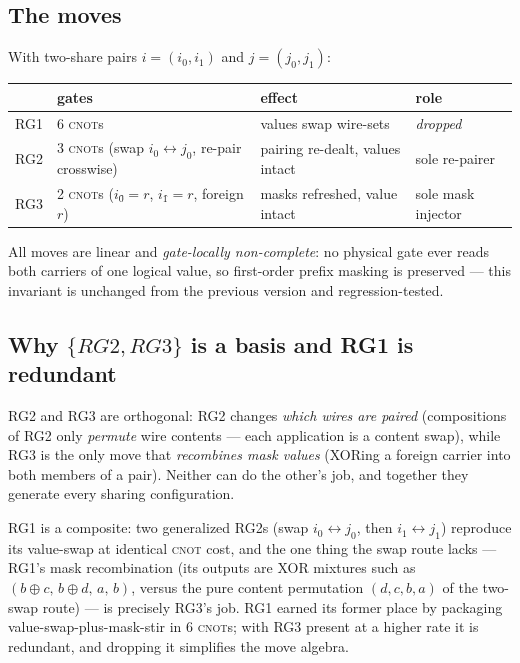 \documentclass[11pt]{article}
\newcommand{\CNOT}{\textsc{cnot}}
\begin{document}
\subsection{The moves}

With two-share pairs $i=(i_0,i_1)$ and $j=(j_0,j_1)$:

\begin{center}
\begin{tabular}{llll}
\toprule
 & gates & effect & role \\
\midrule
RG1 & 6 \CNOT{}s & values swap wire-sets & \emph{dropped} \\
RG2 & 3 \CNOT{}s (swap $i_0 \leftrightarrow j_0$, re-pair crosswise) & pairing re-dealt, values intact & sole re-pairer \\
RG3 & 2 \CNOT{}s ($i_0 \mathrel{\hat{}}= r$, $i_1 \mathrel{\hat{}}= r$, foreign $r$) & masks refreshed, value intact & sole mask injector \\
\bottomrule
\end{tabular}
\end{center}

All moves are linear and \emph{gate-locally non-complete}: no physical gate
ever reads both carriers of one logical value, so first-order prefix
masking is preserved --- this invariant is unchanged from the previous
version and regression-tested.

\subsection{Why $\{RG2, RG3\}$ is a basis and RG1 is redundant}

RG2 and RG3 are orthogonal: RG2 changes \emph{which wires are paired}
(compositions of RG2 only \emph{permute} wire contents --- each application
is a content swap), while RG3 is the only move that \emph{recombines mask
values} (XORing a foreign carrier into both members of a pair). Neither can
do the other's job, and together they generate every sharing configuration.

RG1 is a composite: two generalized RG2s (swap $i_0\leftrightarrow j_0$,
then $i_1\leftrightarrow j_1$) reproduce its value-swap at identical
\CNOT{} cost, and the one thing the swap route lacks --- RG1's mask
recombination (its outputs are XOR mixtures such as
$(b\oplus c,\, b\oplus d,\, a,\, b)$, versus the pure content permutation
$(d,c,b,a)$ of the two-swap route) --- is precisely RG3's job. RG1 earned
its former place by packaging value-swap-plus-mask-stir in 6 \CNOT{}s; with
RG3 present at a higher rate it is redundant, and dropping it simplifies the
move algebra.
\end{document}

